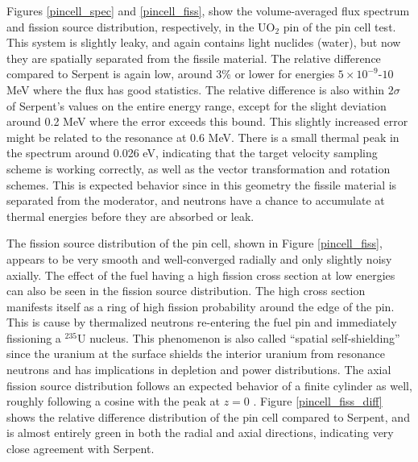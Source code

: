 Figures \ref{pincell_spec} and \ref{pincell_fiss}, show the volume-averaged flux spectrum and fission source distribution, respectively, in the UO$_2$ pin of the pin cell test.  This system is slightly leaky, and again contains light nuclides (water), but now they are spatially separated from the fissile material.  The relative difference compared to Serpent is again low, around 3\% or lower for energies $5\times10^{-9}$-$10$ MeV where the flux has good statistics.  The relative difference is also within $2\sigma$ of Serpent's values on the entire energy range, except for the slight deviation around 0.2 MeV where the error exceeds this bound.  This slightly increased error might be related to the resonance at 0.6 MeV.  There is a small thermal peak in the spectrum around 0.026 eV, indicating that the target velocity sampling scheme is working correctly, as well as the vector transformation and rotation schemes.  This is expected behavior since in this geometry the fissile material is separated from the moderator, and neutrons have a chance to accumulate at thermal energies before they are absorbed or leak.  

The fission source distribution of the pin cell, shown in Figure \ref{pincell_fiss}, appears to be very smooth and well-converged radially and only slightly noisy axially.  The effect of the fuel having a high fission cross section at low energies can also be seen in the fission source distribution.  The high cross section manifests itself as a ring of high fission probability around the edge of the pin.  This is cause by thermalized neutrons re-entering the fuel pin and immediately fissioning a $^{235}$U nucleus.  This phenomenon is also called ``spatial self-shielding'' since the uranium at the surface shields the interior uranium from resonance neutrons and has implications in depletion and power distributions.  
The axial fission source distribution follows an expected behavior of a finite cylinder as well, roughly following a cosine with the peak at $z=0$ \cite{duderstadt}.  Figure \ref{pincell_fiss_diff} shows the relative difference distribution of the pin cell compared to Serpent, and is almost entirely green in both the radial and axial directions, indicating very close agreement with Serpent.





